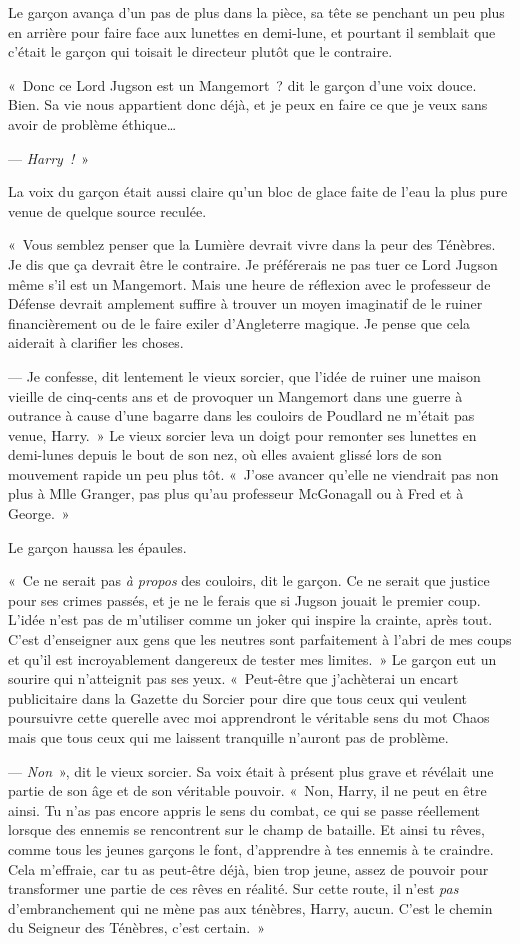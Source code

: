 Le garçon avança d'un pas de plus dans la pièce, sa tête se penchant un peu plus en arrière pour faire face aux lunettes en demi-lune, et pourtant il semblait que c'était le garçon qui toisait le directeur plutôt que le contraire.

«~Donc ce Lord Jugson est un Mangemort~? dit le garçon d'une voix douce.
Bien. Sa vie nous appartient donc déjà, et je peux en faire ce que je veux sans avoir de problème éthique…

--- \emph{Harry~!}~»

La voix du garçon était aussi claire qu'un bloc de glace faite de l'eau la plus pure venue de quelque source reculée.

«~Vous semblez penser que la Lumière devrait vivre dans la peur des Ténèbres.
Je dis que ça devrait être le contraire.
Je préférerais ne pas tuer ce Lord Jugson même s'il est un Mangemort.
Mais une heure de réflexion avec le professeur de Défense devrait amplement suffire à trouver un moyen imaginatif de le ruiner financièrement ou de le faire exiler d'Angleterre magique.
Je pense que cela aiderait à clarifier les choses.

--- Je confesse, dit lentement le vieux sorcier, que l'idée de ruiner une maison vieille de cinq-cents ans et de provoquer un Mangemort dans une guerre à outrance à cause d'une bagarre dans les couloirs de Poudlard ne m'était pas venue, Harry.~»
Le vieux sorcier leva un doigt pour remonter ses lunettes en demi-lunes depuis le bout de son nez, où elles avaient glissé lors de son mouvement rapide un peu plus tôt.
«~J'ose avancer qu'elle ne viendrait pas non plus à Mlle Granger, pas plus qu'au professeur McGonagall ou à Fred et à George.~»

Le garçon haussa les épaules.

«~Ce ne serait pas \emph{à propos} des couloirs, dit le garçon.
Ce ne serait que justice pour ses crimes passés, et je ne le ferais que si Jugson jouait le premier coup.
L'idée n'est pas de m'utiliser comme un joker qui inspire la crainte, après tout.
C'est d'enseigner aux gens que les neutres sont parfaitement à l'abri de mes coups et qu'il est incroyablement dangereux de tester mes limites.~»
Le garçon eut un sourire qui n'atteignit pas ses yeux.
«~Peut-être que j'achèterai un encart publicitaire dans la Gazette du Sorcier pour dire que tous ceux qui veulent poursuivre cette querelle avec moi apprendront le véritable sens du mot Chaos mais que tous ceux qui me laissent tranquille n'auront pas de problème.

--- \emph{Non}~», dit le vieux sorcier.
Sa voix était à présent plus grave et révélait une partie de son âge et de son véritable pouvoir.
«~Non, Harry, il ne peut en être ainsi.
Tu n'as pas encore appris le sens du combat, ce qui se passe réellement lorsque des ennemis se rencontrent sur le champ de bataille.
Et ainsi tu rêves, comme tous les jeunes garçons le font, d'apprendre à tes ennemis à te craindre.
Cela m'effraie, car tu as peut-être déjà, bien trop jeune, assez de pouvoir pour transformer une partie de ces rêves en réalité.
Sur cette route, il n'est \emph{pas} d'embranchement qui ne mène pas aux ténèbres, Harry, aucun.
C'est le chemin du Seigneur des Ténèbres, c'est certain.~»

